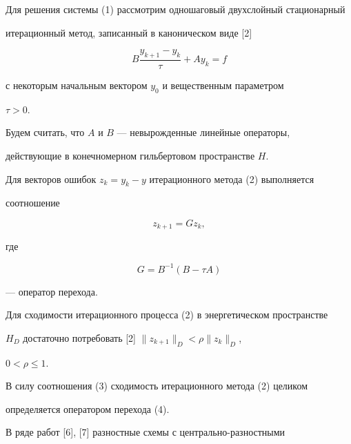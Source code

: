 

 


Для решения системы (1) рассмотрим одношаговый двухслойный стационарный 


итерационный метод, записанный в каноническом виде [2] 


\begin{equation} 


B\frac{y_{k+1}-y_k}{\tau}+A y_k=f 


\end{equation} 


с некоторым начальным вектором $y_0$ и вещественным параметром 


$\tau>0$. 


 


Будем считать, что $A$ и $B$ --- невырожденные линейные операторы, 


действующие в конечномерном гильбертовом пространстве $H$. 


Для векторов ошибок $z_k=y_k-y$ итерационного метода (2) выполняется 


соотношение 


\begin{equation} 


z_{k+1}=G z_k, 


\end{equation} 


где 


\begin{equation} 


G=B^{-1}(B-\tau A) 


\end{equation} 


--- оператор перехода. 


 


Для сходимости итерационного процесса (2) в энергетическом пространстве 


$H_D$ достаточно потребовать [2] $\|z_{k+1}\|_D<\rho\|z_k\|_D$, 


$0<\rho\le1$. 


В силу соотношения (3) сходимость итерационного метода (2) целиком 


определяется оператором перехода (4). 


 


В ряде работ [6], [7] разностные схемы с центрально-разностными 


